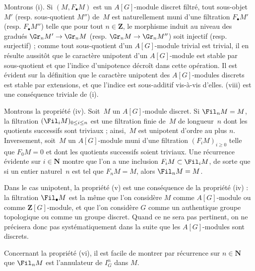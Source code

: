 \documentclass[10pt]{../fichiers-configuration-latex/smfart}
\begin{document}
Montrons (i).
Si $(M,F_\bullet M)$ est un $A[G]$-module discret filtré, tout sous-objet
$M'$ (resp. sous-quotient $M''$) de $M$ est naturellement muni d'une
filtration $F_\bullet M'$ (resp. $F_\bullet M''$) telle que pour tout
$n\in\mathbf{Z}$, le morphisme induit au niveau des gradués $\Gr_n M'\to
\Gr_n M$ (resp. $\Gr_n M\to \Gr_n M''$) soit injectif (resp. surjectif) ;
comme tout sous-quotient d'un $A[G]$-module trivial est trivial, il en
résulte aussitôt que le caractère unipotent d'un $A[G]$-module est stable
par sous-quotient et que l'indice d'unipotence décroît dans cette
opération. Il est évident sur la définition que le caractère unipotent des
$A[G]$-modules discrets est stable par extensions, et que l'indice est
sous-additif vis-à-vis d'elles. (viii) est une conséquence triviale de (i).

Montrons la propriété (iv). Soit $M$ un $A[G]$-module discret.
Si $\Fil_n M=M$, la filtration $(\Fil_iM)_{0\leq i\leq n}$ est une
filtration finie de $M$ de longueur $n$ dont les quotients successifs sont
triviaux ; ainsi, $M$ est unipotent d'ordre au plus $n$. Inversement,
soit $M$ un $A[G]$-module muni d'une filtration $(F_i M)_{i\geq 0}$ telle
que $F_0M=0$ et dont les quotients successifs soient triviaux. Une
récurrence évidente sur $i\in\mathbf{N}$ montre que l'on a une inclusion
$F_i M\subset \Fil_i M$, de sorte que si un entier naturel $n$ est tel que
$F_n M=M$, alors $\Fil_n M=M$.

Dans le cas unipotent, la propriété (v) est une conséquence de la propriété
(iv) : la filtration $\Fil_\bullet M$ est la même que l'on considère $M$
comme $A[G]$-module ou comme $\mathbf{Z}[G]$-module, et que l'on considère
$G$ comme un authentique groupe topologique ou comme un groupe discret.
Quand ce ne sera pas pertinent, on ne précisera donc pas systématiquement
dans la suite que les $A[G]$-modules sont discrets.

Concernant la propriété (vi), il est facile de montrer par récurrence sur
$n\in\mathbf{N}$ que $\Fil_n M$ est l'annulateur de $I_G^n$ dans $M$.
\end{document}
